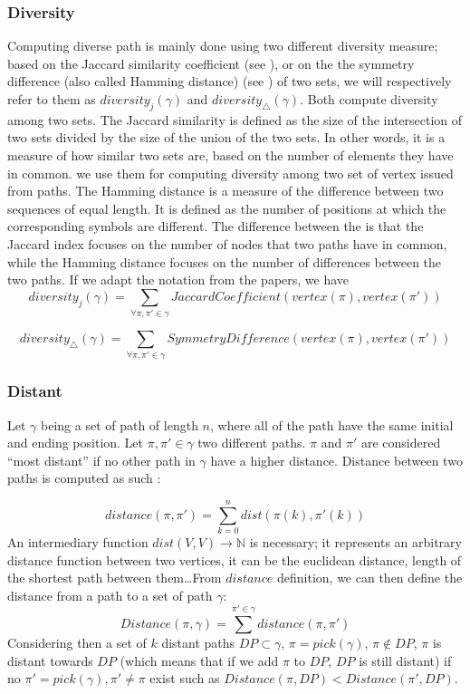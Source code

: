 \subsubsection{Diversity}\label{sec:diversity}

Computing diverse path is mainly done using two different diversity measure; based on the Jaccard similarity coefficient (see \cite{habochal21a}), or on the the symmetry difference (also called Hamming distance) (see \cite{hanaka2022computing}) of two sets, we will respectively refer to them as \(diversity_j(\gamma)\) and \(diversity_{\bigtriangleup}(\gamma)\). Both compute diversity among two sets. The Jaccard similarity is defined as the size of the intersection of two sets divided by the size of the union of the two sets. In other words, it is a measure of how similar two sets are, based on the number of elements they have in common. we use them for computing diversity among two set of vertex issued from paths. The Hamming distance is a measure of the difference between two sequences of equal length. It is defined as the number of positions at which the corresponding symbols are different. The difference between the is that the Jaccard index focuses on the number of nodes that two paths have in common, while the Hamming distance focuses on the number of differences between the two paths. If we adapt the notation from the papers, we have
\[
  diversity_j(\gamma)=\sum_{\forall \pi,\pi' \in \gamma}{JaccardCoefficient(vertex(\pi),vertex(\pi'))}
\]

\[
  diversity_{\bigtriangleup}(\gamma)=\sum_{\forall \pi,\pi' \in \gamma}{SymmetryDifference(vertex(\pi),vertex(\pi'))}
\]  





\subsubsection{Distant}\label{sec:distant}
Let \(\gamma\) being a set of path of length \(n\), where all of the path have the same initial and ending position. Let \(\pi,\pi' \in \gamma\) two different paths. \(\pi\) and \(\pi'\) are considered ``most distant'' if no other path in \(\gamma\) have a higher distance. Distance between two paths is computed as such :


\[
  distance(\pi,\pi') = \sum_{k=0}^{n}{dist(\pi(k),\pi'(k))}   
 \] An intermediary function \(dist(V,V) \rightarrow \mathbb{N}\) is necessary; it represents an arbitrary distance function between two vertices, it can be the euclidean distance, length of the shortest path between them\ldots From \(distance\) definition, we can then define the distance from a path to a set of path \(\gamma\): \[
  Distance(\pi,\gamma) = \sum^{\pi'\in\gamma}{distance(\pi,\pi')}   
\] Considering then a set of \(k\) distant paths \(DP \subset \gamma \), \(\pi = pick(\gamma)\), \(\pi \notin DP \), \(\pi\) is distant towards \(DP\) (which means that if we add \(\pi\) to \(DP\), \(DP\) is still distant) if no \(\pi' = pick(\gamma), \pi' \neq \pi\) exist such as \( Distance(\pi,DP) < Distance(\pi',DP)\).


